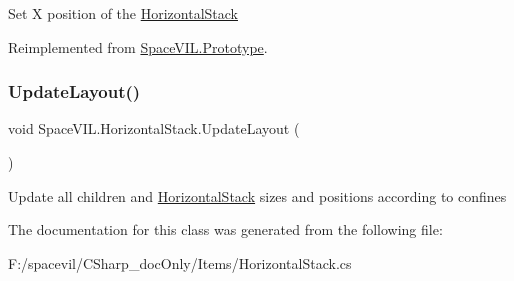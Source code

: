 Set X position of the \mbox{\hyperlink{class_space_v_i_l_1_1_horizontal_stack}{Horizontal\+Stack}} 



Reimplemented from \mbox{\hyperlink{class_space_v_i_l_1_1_prototype}{Space\+V\+I\+L.\+Prototype}}.

\mbox{\label{class_space_v_i_l_1_1_horizontal_stack_ace785e253da273b8eb7d247506f2e747}} 
\subsubsection{\texorpdfstring{Update\+Layout()}{UpdateLayout()}}
{\footnotesize\ttfamily void Space\+V\+I\+L.\+Horizontal\+Stack.\+Update\+Layout (\begin{DoxyParamCaption}{ }\end{DoxyParamCaption})}



Update all children and \mbox{\hyperlink{class_space_v_i_l_1_1_horizontal_stack}{Horizontal\+Stack}} sizes and positions according to confines 



The documentation for this class was generated from the following file\+:\begin{DoxyCompactItemize}
\item 
F\+:/spacevil/\+C\+Sharp\+\_\+doc\+Only/\+Items/Horizontal\+Stack.\+cs\end{DoxyCompactItemize}
